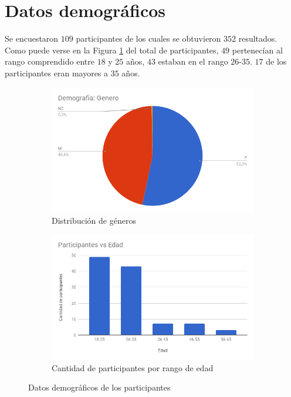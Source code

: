 

\section{Datos demográficos}

Se encuestaron $109$ participantes de los cuales se obtuvieron $352$ resultados. Como puede verse en la Figura \ref{genero} del total de participantes, $49$ pertenecían al rango comprendido entre $18$ y $25$ años, $43$ estaban en el rango $26$-$35$. $17$ de los participantes eran mayores a $35$ años.

\begin{figure}
\centering
\begin{subfigure}{.5\textwidth}
  \centering
	\includegraphics[trim={0 0 0 1.6cm},clip,width=1\linewidth]{datosDemograficos/genero.png}
  \caption{Distribución de géneros}
  \label{genero}
\end{subfigure}%
\begin{subfigure}{.5\textwidth}
  \centering
	\includegraphics[trim={0 0 0 1.6cm},clip,width=1\linewidth]{datosDemograficos/edad.png}
  \caption{Cantidad de participantes por rango de edad}
  \label{fig:sub2}
\end{subfigure}
\caption{Datos demográficos de los participantes}
\label{edad}
\end{figure}

